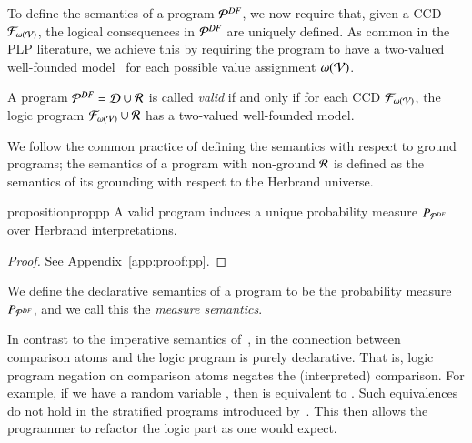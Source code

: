 To define the semantics of a \dfplpsty program ${{\mathcal{P}}^{DF}}$, we now require that, given a CCD $\mathcal{F}_{\omega(\mathcal{V})}$, the logical consequences in ${{\mathcal{P}}^{DF}}$ are uniquely defined.
As common in the PLP literature, we achieve this by requiring the program to have a two-valued well-founded model~\citep{van1991well} for each possible value assignment $\omega(\mathcal{V})$.


\begin{definition}\label{def:core-valid}
A \dfplpsty program ${{\mathcal{P}}^{DF}}=\mathcal{D} \cup{\mathcal{R}} $ is called \emph{valid} if and only if for each CCD $\mathcal{F}_{\omega(\mathcal{V})}$, the logic program $\mathcal{F}_{\omega(\mathcal{V})} \cup  {\mathcal{R}}$ has a two-valued well-founded model. 
\end{definition}



We follow the common practice of defining the semantics with respect to ground programs; the semantics of a program with non-ground ${\mathcal{R}}$ is defined as the semantics of its grounding with respect to the  Herbrand universe.

\begin{restatable}{proposition}{proppp}
\label{prop:pp}
A valid \dfplpsty program \dfprogram  induces a unique probability measure $P_{{\mathcal{P}}^{DF}}$ over Herbrand interpretations.
\end{restatable}

\begin{proof}
    See Appendix~\ref{app:proof:pp}.
\end{proof}


\begin{definition}
    We define the declarative semantics of a \dfplpsty program \dfprogram to be the probability measure $P_{{\mathcal{P}}^{DF}}$, and we call this the {\em measure semantics}.  
\end{definition}

In contrast to the imperative semantics of~\citet{nitti2016probabilistic}, in \dfplpsty the connection between comparison atoms and the logic program is purely declarative. That is, logic program negation on comparison atoms negates the (interpreted) comparison. For example, if we have a random variable , then  is equivalent to . Such equivalences do not hold in the stratified programs introduced by~\citet{nitti2016probabilistic}.
This then allows the programmer to refactor the logic part as one would expect. 



